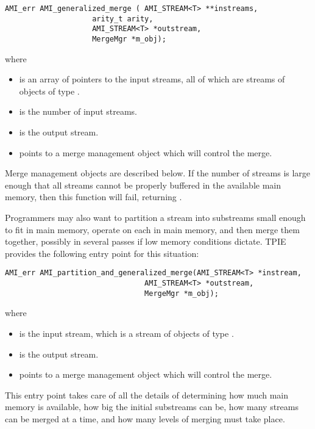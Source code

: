 \begin{verbatim}
AMI_err AMI_generalized_merge ( AMI_STREAM<T> **instreams, 
                    arity_t arity,
                    AMI_STREAM<T> *outstream, 
                    MergeMgr *m_obj);
\end{verbatim}

\noindent
where
\begin{itemize}
    \item {} is an array of pointers to the
    input streams, all of which are streams of objects of
    type .
    \item {} is the number of input streams.
    \item {} is the output stream.
    \item {} points to a merge management
    object which will control the merge.
\end{itemize}

Merge management objects are described below. If the number of
streams is large enough that all streams cannot be properly buffered in the
available main memory, then this function will fail, returning
.

Programmers may also want to partition a stream into
substreams small enough to fit in main memory, operate on
each in main memory, and then merge them together, possibly
in several passes if low memory conditions dictate. TPIE
provides the following entry point for this situation:
\begin{verbatim}
AMI_err AMI_partition_and_generalized_merge(AMI_STREAM<T> *instream,
                                AMI_STREAM<T> *outstream, 
                                MergeMgr *m_obj);
\end{verbatim}
\noindent
where
\begin{itemize}
    \item {} is the
    input stream, which is a stream of objects of
    type .
    \item {} is the output stream.
    \item {} points to a merge management
    object which will control the merge.
\end{itemize}
This entry point takes care of all the details of determining how much
main memory is available, how big the initial substreams can be, how
many streams can be merged at a time, and how many levels of merging
must take place. 

